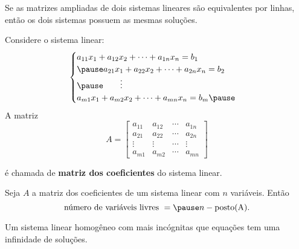 \documentclass{beamer}
\begin{document}
    \begin{frame}
        \begin{teorema}
            Se as matrizes ampliadas \pause de dois sistemas lineares são equivalentes por linhas, \pause então os dois sistemas possuem as mesmas soluções.
        \end{teorema}
    \end{frame}

    \begin{frame}
        Considere o sistema linear:
        \begin{equation*}
            \begin{cases}
                a_{11}x_1 + a_{12}x_2 + \cdots + a_{1n}x_n = b_1\\\pause
                a_{21}x_1 + a_{22}x_2 + \cdots + a_{2n}x_n = b_2\\\pause
                \qquad \vdots\\
                a_{m1}x_1 + a_{m2}x_2 + \cdots + a_{mn}x_n = b_m\pause
            \end{cases}
        \end{equation*}
        A matriz
        \[
            A = \begin{bmatrix}
                a_{11} & a_{12} & \cdots & a_{1n}\\
                a_{21} & a_{22} & \cdots & a_{2n}\\
                \vdots & \vdots & \cdots & \vdots\\
                a_{m1} & a_{m2} & \cdots & a_{mn}
            \end{bmatrix}
        \]

        é chamada de \textbf{matriz dos coeficientes} do sistema linear.
    \end{frame}

    \begin{frame}
        \begin{teorema}
            Seja $A$ a matriz dos coeficientes de um sistema linear \pause com $n$ variáveis. Então\pause
            \[
                \mbox{número de variáveis livres } = \pause n - \p{A}.
            \]
        \end{teorema}
    \end{frame}

    \begin{frame}
        \begin{teorema}
            Um sistema linear homogêneo com mais incógnitas que equações \pause tem uma infinidade de soluções.
        \end{teorema}
    \end{frame}
\end{document}

